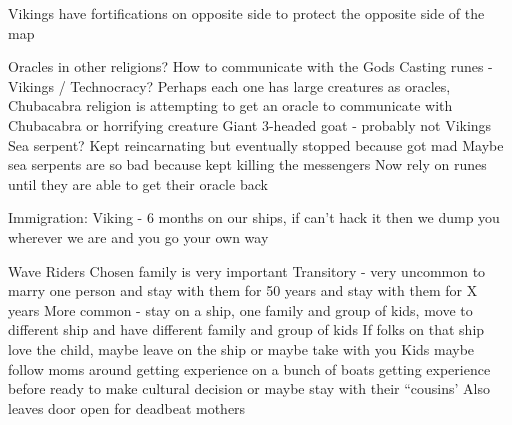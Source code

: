 \documentclass[blue]{GL2020}
\begin{document}
Vikings have fortifications on opposite side to protect the opposite side of the map


Oracles in other religions?  How to communicate with the Gods
Casting runes - Vikings / Technocracy?
Perhaps each one has large creatures as oracles, Chubacabra religion is attempting to get an oracle to communicate with
Chubacabra or horrifying creature
Giant 3-headed goat - probably not
Vikings
Sea serpent?  Kept reincarnating but eventually stopped because got mad
Maybe sea serpents are so bad because kept killing the messengers
Now rely on runes until they are able to get their oracle back


Immigration: Viking - 6 months on our ships, if can’t hack it then we dump you wherever we are and you go your own way

Wave Riders
Chosen family is very important
Transitory - very uncommon to marry one person and stay with them for 50 years and stay with them for X years
More common - stay on a ship, one family and group of kids, move to different ship and have different family and group of kids
If folks on that ship love the child, maybe leave on the ship or maybe take with you
Kids maybe follow moms around getting experience on a bunch of boats getting experience before ready to make cultural decision or maybe stay with their “cousins’
Also leaves door open for deadbeat mothers
\end{document}
